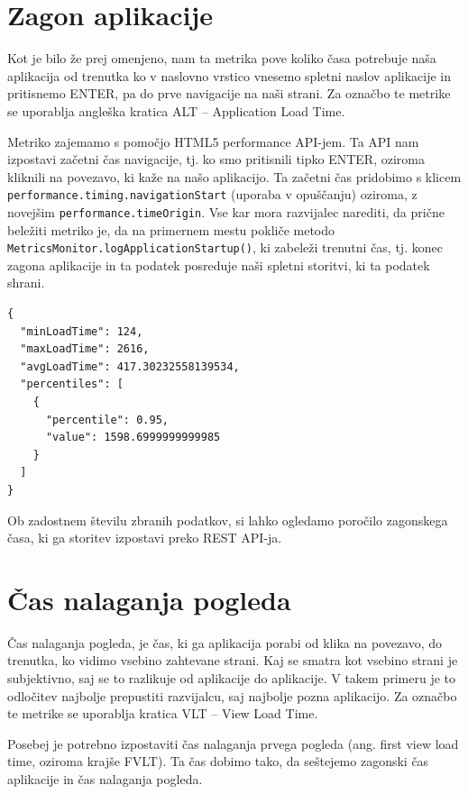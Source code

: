 \documentclass[a4paper, 12pt]{book}
\begin{document}
\section{Zagon aplikacije}
\label{ch2:sec1}
Kot je bilo že prej omenjeno, nam ta metrika pove koliko časa potrebuje naša aplikacija od trenutka ko v naslovno vrstico vnesemo spletni naslov aplikacije in pritisnemo ENTER, pa do prve navigacije na naši strani. Za označbo te metrike se uporablja angleška kratica ALT – Application Load Time.

Metriko zajemamo s pomočjo HTML5 performance API-jem. Ta API nam izpostavi začetni čas navigacije, tj. ko smo pritisnili tipko ENTER, oziroma kliknili na povezavo, ki kaže na našo aplikacijo. Ta začetni čas pridobimo s klicem \verb|performance.timing.navigationStart| (uporaba v opuščanju) oziroma, z novejšim \verb|performance.timeOrigin|. Vse kar mora razvijalec narediti, da prične beležiti metriko je, da na primernem mestu pokliče metodo \\ \verb|MetricsMonitor.logApplicationStartup()|, ki zabeleži trenutni čas, tj. konec zagona aplikacije in ta podatek posreduje naši spletni storitvi, ki ta podatek shrani.

\begin{lstlisting}[label=app_startup_report, caption=Poročilo zagonskega časa aplikacije]
{
  "minLoadTime": 124,
  "maxLoadTime": 2616,
  "avgLoadTime": 417.30232558139534,
  "percentiles": [
    {
      "percentile": 0.95,
      "value": 1598.6999999999985
    }
  ]
}
\end{lstlisting}

Ob zadostnem številu zbranih podatkov, si lahko ogledamo poročilo zagonskega časa, ki ga storitev izpostavi preko REST API-ja.


\section{Čas nalaganja pogleda}
\label{ch2:sec2}

Čas nalaganja pogleda, je čas, ki ga aplikacija porabi od klika na povezavo, do trenutka, ko vidimo vsebino zahtevane strani. Kaj se smatra kot vsebino strani je subjektivno, saj se to razlikuje od aplikacije do aplikacije. V takem primeru je to odločitev najbolje prepustiti razvijalcu, saj najbolje pozna aplikacijo. Za označbo te metrike se uporablja kratica VLT – View Load Time.

Posebej je potrebno izpostaviti čas nalaganja prvega pogleda (ang. first view load time, oziroma krajše FVLT). Ta čas dobimo tako, da seštejemo zagonski čas aplikacije in čas nalaganja pogleda.
\end{document}
